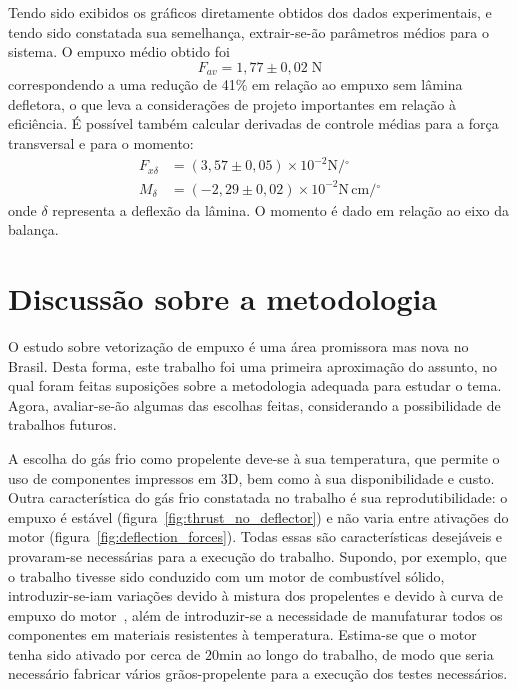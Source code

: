 Tendo sido exibidos os gráficos diretamente obtidos dos dados experimentais, e tendo sido constatada sua semelhança, extrair-se-ão parâmetros médios para o sistema. O empuxo médio obtido foi 
\begin{equation}
    F_{av} = 1,77 \pm 0,02\;\mathrm{N}
\end{equation}
correspondendo a uma redução de 41\% em relação ao empuxo sem lâmina defletora, o que leva a considerações de projeto importantes em relação à eficiência. É possível também calcular derivadas de controle médias para a força transversal e para o momento:
\begin{align}
    F_{x\delta} &= (3,57 \pm 0,05)\times10^{-2} \mathrm{N} / \mathrm{^\circ} \\
    M_\delta &= (-2,29 \pm 0,02)\times10^{-2} \mathrm{N}\,\mathrm{cm} / \mathrm{^\circ}
\end{align}
onde \(\delta \) representa a deflexão da lâmina. O momento é dado em relação ao eixo da balança.\ 

\section{Discussão sobre a metodologia}

O estudo sobre vetorização de empuxo é uma área promissora mas nova no Brasil. Desta forma, este trabalho foi uma primeira aproximação do assunto, no qual foram feitas suposições sobre a metodologia adequada para estudar o tema. Agora, avaliar-se-ão algumas das escolhas feitas, considerando a possibilidade de trabalhos futuros.

A escolha do gás frio como propelente deve-se à sua temperatura, que permite o uso de componentes impressos em 3D, bem como à sua disponibilidade e custo. Outra característica do gás frio constatada no trabalho é sua reprodutibilidade: o empuxo é estável (figura~\ref{fig:thrust_no_deflector}) e não varia entre ativações do motor (figura~\ref{fig:deflection_forces}). Todas essas são características desejáveis e provaram-se necessárias para a execução do trabalho. Supondo, por exemplo, que o trabalho tivesse sido conduzido com um motor de combustível sólido, introduzir-se-iam variações devido à mistura dos propelentes e devido à curva de empuxo do motor~\cite{Sutton}, além de introduzir-se a necessidade de manufaturar todos os componentes em materiais resistentes à temperatura. Estima-se que o motor tenha sido ativado por cerca de \(20\mathrm{min}\) ao longo do trabalho, de modo que seria necessário fabricar vários grãos-propelente para a execução dos testes necessários.

